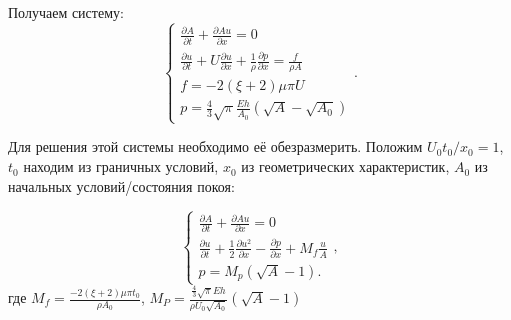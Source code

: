Получаем систему:
\begin{equation}
    \label{sys_of_eq}
    \begin{cases}
        \frac{\partial A}{\partial t}+\frac{\partial Au}{\partial x}=0\\
        \frac{\partial u}{\partial t}+U\frac{\partial u}{\partial x}+\frac{1}{\rho}\frac{\partial p}{\partial x}=\frac{f}{\rho A}\\
        f=-2(\xi+2)\mu\pi U\\
        p=\frac{4}{3}\sqrt{\pi}\frac{Eh}{A_0}(\sqrt{A}-\sqrt{A_0})
    \end{cases}.
    \end{equation}

Для решения этой системы необходимо её обезразмерить. Положим ${U_0 t_0}/{x_0}=1$, $t_0$ находим из граничных условий, 
$x_0$ из геометрических характеристик, $A_0$ из начальных условий/состояния покоя:

\begin{equation}
    \label{sys_of_eq1}
    \begin{cases}
        \frac{\partial A}{\partial t}+\frac{\partial Au}{\partial x}=0\\
        \frac{\partial u}{\partial t}+\frac{1}{2}\frac{\partial u^2}{\partial x}-\frac{\partial p}{\partial x}+M_f \frac{u}{A}\\
        p=M_p(\sqrt{A}-1).
    \end{cases},
    \end{equation}
где $M_f=\frac{-2(\xi+2)\mu \pi t_0}{\rho A_0}$, $M_P=\frac{\frac{4}{3}\sqrt{\pi}Eh}{\rho U_0\sqrt{A_0}}(\sqrt{A}-1)$

    
